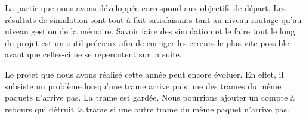 \documentclass[a4paper,11pt]{article}
\begin{document}
La partie que nous avons développée correspond aux objectifs de départ. Les résultats de simulation sont tout à fait satisfaisants tant au niveau routage qu’au niveau gestion de la mémoire. Savoir faire des simulation et le faire tout le long du projet est un outil précieux afin de corriger les erreurs le plus vite possible avant que celles-ci ne se répercutent sur la suite.

Le projet que nous avons réalisé cette année peut encore évoluer. En effet, il subsiste un problème lorsqu'une trame arrive puis une des trames du même paquets n'arrive pas. La trame est gardée. Nous pourrions ajouter un compte à rebours qui détruit la trame si une autre trame du même paquet n'arrive pas.
\end{document}
